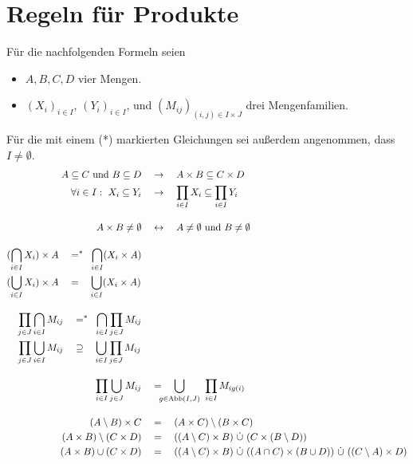 \section{Regeln für Produkte} \label{anhang:prodregeln}
Für die nachfolgenden Formeln seien
\begin{itemize}
    \item $A,B,C,D$ vier Mengen.
    \item $(X_i)_{i\in I}$, $(Y_i)_{i\in I}$, und $(M_{ij})_{(i,j)\in I\times J}$ drei Mengenfamilien.
\end{itemize}
Für die mit einem (*) markierten Gleichungen sei außerdem angenommen, dass $I\neq\emptyset$.
\begingroup
\allowdisplaybreaks
\begin{align*}
    A\subseteq C\ \text{und}\ B\subseteq D & \quad\to\quad A\times B\subseteq C\times D \\
    \forall i\in I:\ X_i\subseteq Y_i & \quad\to\quad \smashoperator[l]{\prod_{i\in I}} X_i \subseteq \prod_{i\in I} Y_i \\[1em]
    A\times B \neq \emptyset & \quad \leftrightarrow\quad A\neq \emptyset \ \text{und}\ B\neq \emptyset \\[1em]
    \begin{split}
        (\bigcap_{i\in I} X_i ) \times A & \quad =^* \quad\hspace{-.4em} \smashoperator[l]{\bigcap_{i\in I}} ( X_i \times A )  \\
        (\bigcup_{i\in I} X_i ) \times A & \quad = \quad \smashoperator[l]{\bigcup_{i\in I}} ( X_i \times A)
    \end{split} \\[1em]
    \begin{split}
        \prod_{j \in J} \bigcap_{i \in I} M_{ij} & \quad =^* \quad\hspace{-.4em} \smashoperator[l]{\bigcap_{i\in I}} \prod_{j\in J} M_{ij} \\
        \prod_{j \in J} \bigcup_{i\in I} M_{ij} & \quad\supseteq\quad \smashoperator[l]{\bigcup_{i\in I}} \prod_{j\in J} M_{ij}
    \end{split} \\[1em]
    \prod_{i \in I} \bigcup_{j \in J} M_{ij} & \quad =\quad \smashoperator[l]{\bigcup_{g \in \Abb(I,J)}}\ \prod_{i \in I} M_{ig(i)} \\[1em] %
    (A \setminus B) \times C & \quad = \quad (A \times C) \setminus (B \times C) \\
    (A \times B) \setminus (C \times D) & \quad = \quad ((A \setminus C) \times B) \ \dot\cup\ (C \times (B \setminus D)) \\ %
    (A \times B) \cup (C \times D) & \quad = \quad ((A \setminus C) \times B)  \ \dot\cup\ ((A \cap C) \times (B \cup D)) \ \dot\cup\ ((C \setminus A) \times D) %
\end{align*}
\endgroup
 

